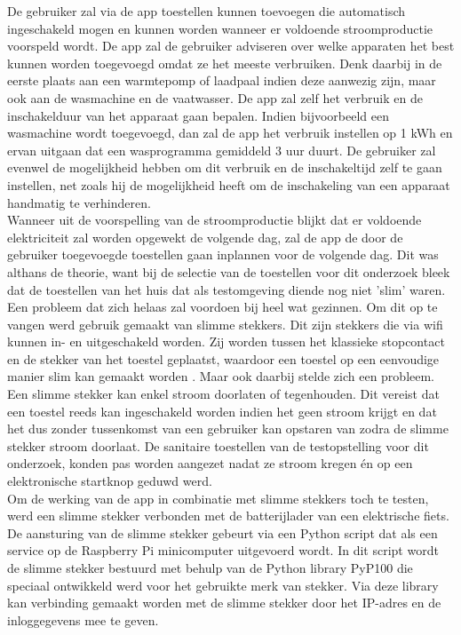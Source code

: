 De gebruiker zal via de app toestellen kunnen toevoegen die automatisch ingeschakeld mogen en kunnen worden wanneer er voldoende stroomproductie voorspeld wordt. De app zal de gebruiker adviseren over welke apparaten het best kunnen worden toegevoegd omdat ze het meeste verbruiken. Denk daarbij in de eerste plaats aan een warmtepomp of laadpaal indien deze aanwezig zijn, maar ook aan de wasmachine en de vaatwasser. De app zal zelf het verbruik en de inschakelduur van het apparaat gaan bepalen. Indien bijvoorbeeld een wasmachine wordt toegevoegd, dan zal de app het verbruik instellen op 1 kWh en ervan uitgaan dat een wasprogramma gemiddeld 3 uur duurt. De gebruiker zal evenwel de mogelijkheid hebben om dit verbruik en de inschakeltijd zelf te gaan instellen, net zoals hij de mogelijkheid heeft om de inschakeling van een apparaat handmatig te verhinderen.\\

Wanneer uit de voorspelling van de stroomproductie blijkt dat er voldoende elektriciteit zal worden opgewekt de volgende dag, zal de app de door de gebruiker toegevoegde toestellen gaan inplannen voor de volgende dag. Dit was althans de theorie, want bij de selectie van de toestellen voor dit onderzoek bleek dat de toestellen van het huis dat als testomgeving diende nog niet 'slim' waren. Een probleem dat zich helaas zal voordoen bij heel wat gezinnen. Om dit op te vangen werd gebruik gemaakt van slimme stekkers. Dit zijn stekkers die via wifi kunnen in- en uitgeschakeld worden. Zij worden tussen het klassieke stopcontact en de stekker van het toestel geplaatst, waardoor een toestel op een eenvoudige manier slim kan gemaakt worden \autocite{Jong2020}. Maar ook daarbij stelde zich een probleem. Een slimme stekker kan enkel stroom doorlaten of tegenhouden. Dit vereist dat een toestel reeds kan ingeschakeld worden indien het geen stroom krijgt en dat het dus zonder tussenkomst van een gebruiker kan opstaren van zodra de slimme stekker stroom doorlaat. De sanitaire toestellen van de testopstelling voor dit onderzoek, konden pas worden aangezet nadat ze stroom kregen én op een elektronische startknop geduwd werd. \\

Om de werking van de app in combinatie met slimme stekkers toch te testen, werd een slimme stekker verbonden met de batterijlader van een elektrische fiets. De aansturing van de slimme stekker gebeurt via een Python script dat als een service op de Raspberry Pi minicomputer uitgevoerd wordt. In dit script wordt de slimme stekker bestuurd met behulp van de Python library PyP100 die speciaal ontwikkeld werd voor het gebruikte merk van stekker. Via deze library kan verbinding gemaakt worden met de slimme stekker door het IP-adres en de inloggegevens mee te geven. \\

